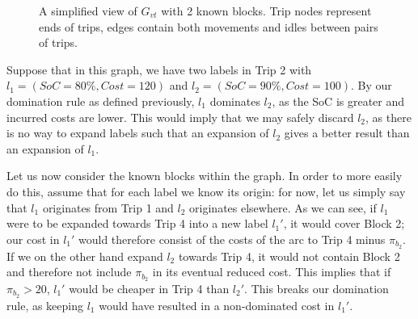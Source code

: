 \documentclass[]{article}
\begin{document}
\begin{figure}[h]
  \centering
  \caption{A simplified view of $G_{vt}$ with 2 known blocks. Trip nodes represent ends of trips, edges contain both movements and idles between pairs of trips.}
  \label{fig:evsp-graph-blocks}
\end{figure}

Suppose that in this graph, we have two labels in Trip 2 with $l_1 = (SoC = 80\%, Cost = 120)$ and $l_2 = (SoC = 90\%, Cost = 100)$. By our domination rule as defined previously, $l_1$ dominates $l_2$, as the SoC is greater and incurred costs are lower. This would imply that we may safely discard $l_2$, as there is no way to expand labels such that an expansion of $l_2$ gives a better result than an expansion of $l_1$.

Let us now consider the known blocks within the graph. In order to more easily do this, assume that for each label we know its origin: for now, let us simply say that $l_1$ originates from Trip 1 and $l_2$ originates elsewhere. As we can see, if $l_1$ were to be expanded towards Trip 4 into a new label $l_1'$, it would cover Block 2; our cost in $l_1'$ would therefore consist of the costs of the arc to Trip 4 minus $\pi_{b_2}$. If we on the other hand expand $l_2$ towards Trip 4, it would not contain Block 2 and therefore not include $\pi_{b_2}$ in its eventual reduced cost. This implies that if $\pi_{b_2} > 20$, $l_1'$ would be cheaper in Trip 4 than $l_2'$. This breaks our domination rule, as keeping $l_1$ would have resulted in a non-dominated cost in $l_1'$.
\end{document}
